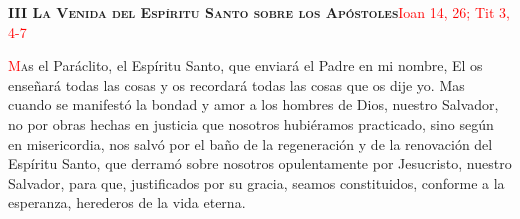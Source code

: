 \noindent\textbf{\textsc{III La Venida del Espíritu Santo sobre los Apóstoles}}\hfill\textcolor{red}{Ioan 14, 26; Tit 3, 4-7}

\vspace{0.25em}

\lettrine[lines=2]{\textcolor{red}{M}}as el Paráclito, el Espíritu Santo, que enviará el Padre en mi nombre, El os enseñará todas las cosas y os recordará todas las cosas que os dije yo.
Mas cuando se manifestó la bondad y amor a los hombres de Dios, nuestro Salvador, no por obras hechas en justicia que nosotros hubiéramos practicado, sino según en misericordia, nos
salvó por el baño de la regeneración y de la renovación del Espíritu Santo, que derramó sobre nosotros opulentamente por Jesucristo, nuestro Salvador, para que, justificados por su
gracia, seamos constituidos, conforme a la esperanza, herederos de la vida eterna.
